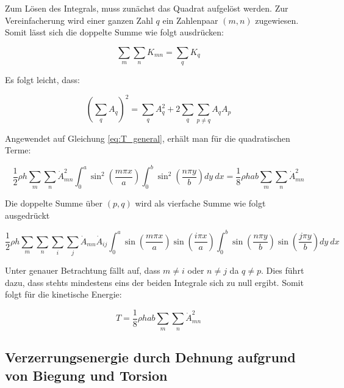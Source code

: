 Zum Lösen des Integrals, muss zunächst das Quadrat aufgelöst werden. Zur Vereinfacherung wird einer ganzen Zahl $q$ ein Zahlenpaar $(m,n)$ zugewiesen.
Somit lässt sich die doppelte Summe wie folgt ausdrücken:

$$\sum_m\sum_n K_{mn}=\sum_q K_q$$

Es folgt leicht, dass:

$$\left(\sum_qA_q\right)^2=\sum_qA^2_q+2\sum_q\sum_{p\neq q}A_qA_p$$


Angewendet auf Gleichung \ref{eq:T_general}, erhält man für die quadratischen Terme:

\begin{equation}
\dfrac{1}{2}\rho h \sum_m\sum_n \dot{A}^2_{mn}\int_0^a\sin^2\left(\dfrac{m\pi x}{a}\right)\int_0^b\sin^2\left(\dfrac{n\pi y}{b}\right) dy \ dx=\dfrac{1}{8}\rho h a b\sum_m\sum_n \dot{A}^2_{mn}
\end{equation}

Die doppelte Summe über $(p,q)$ wird als vierfache Summe wie folgt ausgedrückt

\begin{equation}
\dfrac{1}{2}\rho h \sum_m\sum_n\sum_i\sum_j \dot{A}_{mn}\dot{A}_{ij}\int_0^a\sin\left(\dfrac{m\pi x}{a}\right)\sin\left(\dfrac{i\pi x}{a}\right)\int_0^b\sin\left(\dfrac{n\pi y}{b}\right)\sin\left(\dfrac{j\pi y}{b}\right) dy \ dx
\end{equation}

Unter genauer Betrachtung fällt auf, dass $m\neq i$ oder $n\neq j$ da $q\neq p$. Dies führt dazu, dass stehts mindestens eins der beiden Integrale sich zu null ergibt. Somit folgt für die kinetische Energie:

\begin{equation}
T = \dfrac{1}{8}\rho h a b\sum_m\sum_n \dot{A}^2_{mn}
\label{eq:T}
\end{equation}









\subsection{Verzerrungsenergie durch Dehnung aufgrund von Biegung und Torsion}

